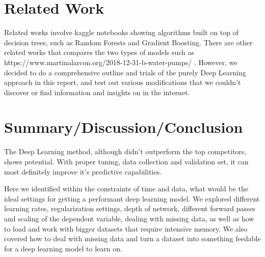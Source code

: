 \documentclass[10pt,twocolumn,letterpaper]{article}
\begin{document}
\section{Related Work}
Related works involve kaggle notebooks showing algorithms built on top of
decision trees, such as Random Forests and Gradient Boosting. There are other
related works that compares the two types of models such as
https://www.martinalarcon.org/2018-12-31-b-water-pumps/ \cite{martin-alarcon}.
However, we decided to do a comprehensive outline and trials of the purely Deep
Learning approach in this report, and test out various modifications that we
couldn’t discover or find information and insights on in the internet.


\section{Summary/Discussion/Conclusion}
The Deep Learning method, although didn’t outperform the top competitors, shows
potential. With proper tuning, data collection and validation set, it can most
definitely improve it’s predictive capabilities.

Here we identified within the constraints of time and data, what would be the
ideal settings for getting a performant deep learning model. We explored
different learning rates, regularization settings, depth of network, different
forward passes and scaling of the dependent variable, dealing with missing data,
as well as how to load and work with bigger datasets that require intensive
memory. We also covered how to deal with missing data and turn a dataset into
something feedable for a deep learning model to learn on.











\end{document}
